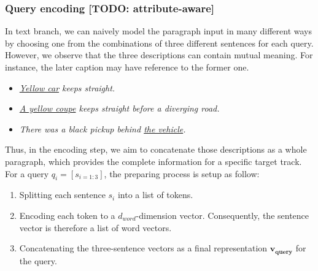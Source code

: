 \subsubsection{Query encoding [TODO: attribute-aware]}
In text branch, we can naively model the paragraph input in many different ways by choosing one from the combinations of three different sentences for each query.
However, we observe that the three descriptions can contain mutual meaning. For instance, the later caption may have reference to the former one.
\begin{itemize}
    \item \textit{\underline{Yellow car} keeps straight.}
    \item \textit{\underline{A yellow coupe} keeps straight before a diverging road.}
    \item \textit{There was a black pickup behind \underline{the vehicle}.}
\end{itemize}
Thus, in the encoding step, we aim to concatenate those descriptions as a whole paragraph, which provides the complete information for a specific target track.
For a query $q_i = [s_{i=1:3}]$, the preparing process is setup as follow:
\begin{enumerate}
    \item Splitting each sentence $s_i$ into a list of tokens.
    \item Encoding each token to a $d_{word}$-dimension vector. Consequently, the sentence vector is therefore a list of word vectors.
    \item Concatenating the three-sentence vectors as a final representation $\mathbf{v_{query}}$ for the query.
\end{enumerate}

